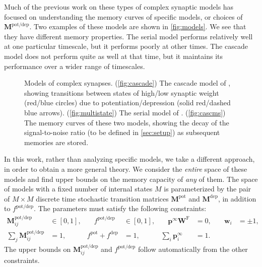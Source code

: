 \documentclass{article} %
\newcommand{\pr}{\mathbf{p}}
\newcommand{\eq}{\pr^\infty}
\newcommand{\w}{\mathbf{w}}
\newcommand{\W}{\mathbf{W}}
\newcommand{\M}{\mathbf{M}}
\newcommand{\frg}{\W^{\mathrm{F}}}
\newcommand{\pot}{^{\text{pot}}}
\newcommand{\dep}{^{\text{dep}}}
\newcommand{\potdep}{^{\text{pot/dep}}}
\begin{document}
Much of the previous work on these types of complex synaptic models has focused on understanding the memory curves of specific models, or choices of $\M\potdep$.
Two examples of these models are shown in \autoref{fig:models}. We see that they have different memory properties.
The serial model performs relatively well at one particular timescale, but it performs poorly at other times.
The cascade model does not perform quite as well at that time, but it maintains its performance over a wider range of timescales.

\begin{figure}[tbp]
 \begin{center}
 \begin{myenuma}
  \item{}\label{fig:cascade}
  \item{}\label{fig:multistate}
  \item{}\label{fig:cascms}
 \end{myenuma}
 \end{center}
  \caption{Models of complex synapses.
  (\ref{fig:cascade}) The cascade model of \cite{Fusi2005cascade}, showing transitions between states of high/low synaptic weight (red/blue circles) due to potentiation/depression (solid red/dashed blue arrows).
  (\ref{fig:multistate}) The serial model of \cite{Leibold2008serial}.
  (\ref{fig:cascms}) The memory curves of these two models, showing the decay of the signal-to-noise ratio (to be defined in \autoref{sec:setup}) as subsequent memories are stored.
  }\label{fig:models}
\end{figure}


In this work, rather than analyzing specific models,  we take a different approach, in order to obtain a more general theory.
We consider the \emph{entire} space of these models and find upper bounds on the memory capacity of \emph{any} of them.
The space of models with a fixed number of internal states $M$ is parameterized by the pair of $M \times M$ discrete time stochastic
transition matrices $\M\pot$ and $\M\dep$, in addition to $f\potdep$.  The parameters must satisfy the following constraints:
%
\begin{equation}\label{eq:constr}
\begin{aligned}
  \M\potdep_{ij} &\in [0,1], &\quad
  f\potdep &\in [0,1], &\quad
  \eq\frg &= 0, &\quad
  \w_i &= \pm 1, \\
  \sum_j \M\potdep_{ij} &= 1, &
  f\pot + f\dep &= 1, &
  \sum_i \eq_i &= 1.
\end{aligned}
\end{equation}
%
The upper bounds on $\M\potdep_{ij}$ and $f\potdep$ follow automatically from the other constraints.
\end{document}
